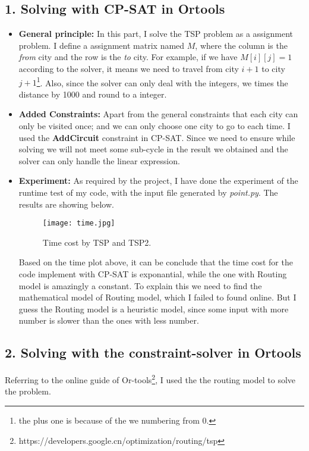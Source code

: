 \documentclass{article}
\begin{document}
\subsection*{1. Solving with CP-SAT in Ortools}
\begin{itemize}
    \item \textbf{General principle: }In this part, I solve the TSP problem as a assignment problem. I define a assignment matrix named $M$, where the column is the \textit{from} city and the row is the \textit{to} city. For example, if we have $M[i][j]=1$ according to the solver, it means we need to travel from city $i+1$ to city $j+1$\footnote{the plus one is because of the we numbering from 0. }. Also, since the solver can only deal with the integers, we times the distance by 1000 and round to a integer. 
    \item \textbf{Added Constraints: }Apart from the general constraints that each city can only be visited once; and we can only choose one city to go to each time. I used the \textbf{AddCircuit} constraint in CP-SAT. Since we need to ensure while solving we will not meet some sub-cycle in the result we obtained and the solver can only handle the linear expression. 
    \item \textbf{Experiment: }As required by the project, I have done the experiment of the runtime test of my code, with the input file generated by \textit{point.py}. The results are showing below. 
    \begin{figure}[h!]
        \centering
        \texttt{[image: time.jpg]}
        \caption{Time cost by TSP and TSP2. }
        \label{fig:my_label}
    \end{figure}
    \newline
    Based on the time plot above, it can be conclude that the time cost for the code implement with CP-SAT is exponantial, while the one with Routing model is amazingly a constant. To explain this we need to find the mathematical model of Routing model, which I failed to found online. But I guess the Routing model is a heuristic model, since some input with more number is slower than the ones with less number. 
\end{itemize}
\subsection*{2. Solving with the constraint-solver in Ortools}
Referring to the online guide of Or-tools\footnote{https://developers.google.cn/optimization/routing/tsp}, I used the the routing model to solve the problem.
\end{document}
